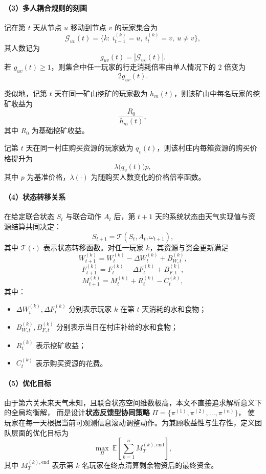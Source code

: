 \documentclass[UTF8,a4paper,12pt]{ctexart}
\begin{document}
\paragraph{（3）多人耦合规则的刻画}

记在第 $t$ 天从节点 $u$ 移动到节点 $v$ 的玩家集合为
\[
\mathcal{G}_{uv}(t)=\{k:\ i_{t-1}^{(k)}=u,\ i_t^{(k)}=v,\ u\neq v\},
\]
其人数记为
\[
g_{uv}(t)=|\mathcal{G}_{uv}(t)|.
\]
若 $g_{uv}(t)\ge 1$，则集合中任一玩家的行走消耗倍率由单人情况下的 $2$ 倍变为
\[
2g_{uv}(t).
\]

类似地，记第 $t$ 天在同一矿山挖矿的玩家数为 $h_m(t)$，则该矿山中每名玩家的挖矿收益为
\[
\frac{R_0}{h_m(t)},
\]
其中 $R_0$ 为基础挖矿收益。

记第 $t$ 天在同一村庄购买资源的玩家数为 $q_v(t)$，则该村庄内每箱资源的购买价格提升为
\[
\lambda\bigl(q_v(t)\bigr)p,
\]
其中 $p$ 为基准价格，$\lambda(\cdot)$ 为随购买人数变化的价格倍率函数。

\paragraph{（4）状态转移关系}

在给定联合状态 $S_t$ 与联合动作 $A_t$ 后，第 $t+1$ 天的系统状态由天气实现值与资源结算共同决定：
\[
S_{t+1}=\mathcal{T}(S_t,A_t,\omega_{t+1}),
\]
其中 $\mathcal{T}(\cdot)$ 表示状态转移函数。对任一玩家 $k$，其资源与资金更新满足
\[
W_{t+1}^{(k)}=W_t^{(k)}-\Delta W_t^{(k)}+B_{W,t}^{(k)},
\]
\[
F_{t+1}^{(k)}=F_t^{(k)}-\Delta F_t^{(k)}+B_{F,t}^{(k)},
\]
\[
M_{t+1}^{(k)}=M_t^{(k)}+R_t^{(k)}-C_t^{(k)},
\]
其中：
\begin{itemize}
    \item $\Delta W_t^{(k)},\Delta F_t^{(k)}$ 分别表示玩家 $k$ 在第 $t$ 天消耗的水和食物；
    \item $B_{W,t}^{(k)},B_{F,t}^{(k)}$ 分别表示当日在村庄补给的水和食物；
    \item $R_t^{(k)}$ 表示挖矿收益；
    \item $C_t^{(k)}$ 表示购买资源的花费。
\end{itemize}

\paragraph{（5）优化目标}

由于第六关未来天气未知，且联合状态空间维数极高，本文不直接追求解析意义下的全局均衡解，
而是设计\textbf{状态反馈型协同策略} $\Pi=\{\pi^{(1)},\pi^{(2)},\ldots,\pi^{(n)}\}$，
使玩家在每一天根据当前可观测信息滚动调整动作。为兼顾收益性与生存性，定义团队层面的优化目标为
\[
\max_{\Pi}\ \mathbb{E}\!\left[\sum_{k=1}^{n} M_T^{(k),\mathrm{end}}\right],
\]
其中 $M_T^{(k),\mathrm{end}}$ 表示第 $k$ 名玩家在终点清算剩余物资后的最终资金。
\end{document}
